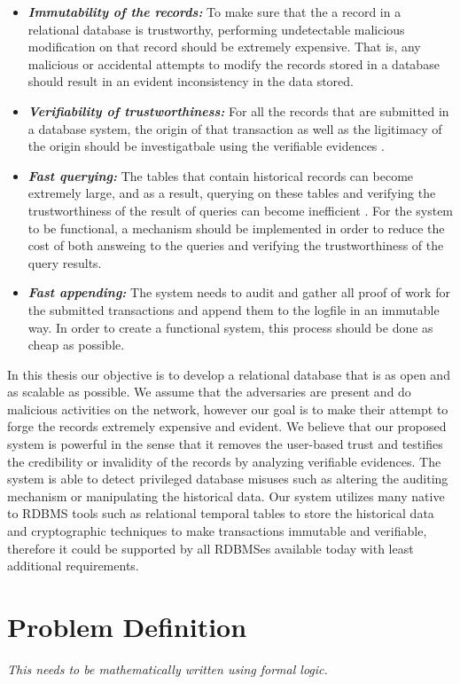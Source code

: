 		\begin{itemize}
			  \item \textbf{\textit{Immutability of the records:}} To make sure that the a record in a relational database is trustworthy, performing undetectable malicious modification on that record should be extremely expensive. That is, any malicious or accidental attempts to modify the records stored in a database should result in an evident inconsistency in the data stored.

			  \item \textbf{\textit{Verifiability of trustworthiness:}} For all the records that are submitted in a database system, the origin of that transaction as well as the ligitimacy of the origin should be investigatbale using the verifiable evidences .

			  \item \textbf{\textit{Fast querying:}} The tables that contain historical records can become extremely large, and as a result, querying on these tables and verifying the trustworthiness of the result of queries can become inefficient \cite{crosby2009tamper-evident}\cite{beirami2018snapshot}. For the system to be functional, a mechanism should be implemented in order to reduce the cost of both answeing to the queries and verifying the trustworthiness of the query results.

			  \item \textbf{\textit{Fast appending:}} The system needs to audit and gather all proof of work for the submitted transactions and append them to the logfile in an immutable way. In order to create a functional system, this process should be done as cheap as possible.
	\end{itemize}
		In this thesis our objective is to develop a relational database that is as open and as scalable as possible. We assume that the adversaries are present and do malicious activities on the network, however our goal is to make their attempt to forge the records extremely expensive and evident. We believe that our proposed system is powerful in the sense that it removes the user-based trust and testifies the credibility or invalidity of the records by analyzing verifiable evidences. The system is able to detect privileged database misuses such as altering the auditing mechanism or manipulating the historical data. Our system utilizes many native to RDBMS tools such as relational temporal tables to store the historical data and cryptographic techniques to make transactions immutable and verifiable, therefore it could be supported by all RDBMSes available today with least additional requirements.

	\section{Problem Definition} \label{sec:problem_definition}

	{\it This needs to be mathematically written using formal logic.}
